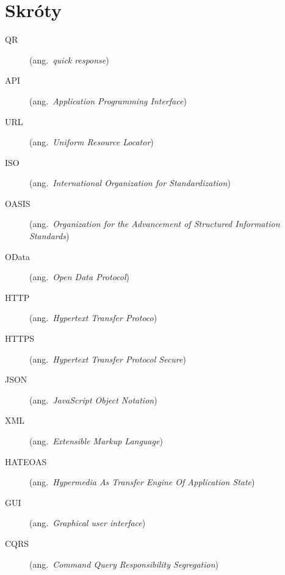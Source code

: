 \chapter*{Skróty}\mbox{}
\label{sec:skroty}
\noindent
\begin{description}
  \item [QR] (ang.\ \emph{quick response})
  \item [API] (ang.\ \emph{Application Programming Interface})
  \item [URL] (ang.\ \emph{Uniform Resource Locator})
  \item [ISO] (ang.\ \emph{International Organization for Standardization})
  \item [OASIS] (ang.\ \emph{Organization for the Advancement of Structured Information Standards})
  \item [OData] (ang.\ \emph{Open Data Protocol})
  \item [HTTP] (ang.\ \emph{Hypertext Transfer Protoco})
  \item [HTTPS] (ang.\ \emph{Hypertext Transfer Protocol Secure})
  \item [JSON] (ang.\ \emph{JavaScript Object Notation})
  \item [XML] (ang.\ \emph{Extensible Markup Language})
  \item [HATEOAS] (ang.\ \emph{Hypermedia As Transfer Engine Of Application State})
  \item [GUI] (ang.\ \emph{Graphical user interface})
  \item [CQRS] (ang.\ \emph{Command Query Responsibility Segregation})
\end{description}
